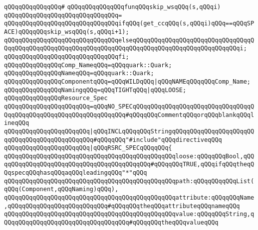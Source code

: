 \verb|qQQqqQQqqQQqqQQq#|\newline
\verb|qQQqqQQqqQQqqQQqfunqQQqskip_wsqQQq(s,qQQqi)|\newline
\verb|qQQqqQQqqQQqqQQqqQQqqQQqqQQqqQQq=|\newline
\verb|qQQqqQQqqQQqqQQqqQQqqQQqqQQqqQQqifqQQq(get_ccqQQq(s,qQQqi)qQQq==qQQqSPACE)qQQqqQQqskip_wsqQQq(s,qQQqi+1);|\newline
\verb|qQQqqQQqqQQqqQQqqQQqqQQqqQQqqQQqelseqQQqqQQqqQQqqQQqqQQqqQQqqQQqqQQqqQQqqQQqqQQqqQQqqQQqqQQqqQQqqQQqqQQqqQQqqQQqqQQqqQQqqQQqqQQqqQQqqQQqi;|\newline
\verb|qQQqqQQqqQQqqQQqqQQqqQQqqQQqqQQqfi;|\newline
\newline
\verb|qQQqqQQqqQQqqQQqComp_NameqQQq=qQQqquark::Quark;|\newline
\verb|qQQqqQQqqQQqqQQqNameqQQq=qQQqquark::Quark;|\newline
\newline
\verb|qQQqqQQqqQQqqQQqComponentqQQq=qQQqWILDqQQq|\verb#|qQQqNAMEqQQqqQQqComp_Name;#\newline
\newline
\verb|qQQqqQQqqQQqqQQqNamingqQQq=qQQqTIGHTqQQq|\verb#|qQQqLOOSE;#\newline
\newline
\verb|qQQqqQQqqQQqqQQqResource_Spec|\newline
\verb|qQQqqQQqqQQqqQQqqQQqqQQq=qQQqNO_SPECqQQqqQQqqQQqqQQqqQQqqQQqqQQqqQQqqQQqqQQqqQQqqQQqqQQqqQQqqQQqqQQqqQQq#qQQqqQQqCommentqQQqorqQQqblankqQQqlineqQQq|\newline
\verb|qQQqqQQqqQQqqQQqqQQqqQQq|\verb#|qQQqINCLqQQqqQQqStringqQQqqQQqqQQqqQQqqQQqqQQqqQQqqQQqqQQqqQQqqQQqqQQq#\verb|#qQQqqQQq"#include"qQQqdirectiveqQQq|\newline
\verb|qQQqqQQqqQQqqQQqqQQqqQQq|\verb#|qQQqRSRC_SPECqQQqqQQq{#\newline
\verb|qQQqqQQqqQQqqQQqqQQqqQQqqQQqqQQqqQQqqQQqqQQqqQQqloose:qQQqqQQqBool,qQQqqQQqqQQqqQQqqQQqqQQqqQQqqQQqqQQqqQQqqQQq#qQQqqQQqTRUE,qQQqifqQQqtheqQQqspecqQQqhasqQQqaqQQqleadingqQQq"*"qQQq|\newline
\verb|qQQqqQQqqQQqqQQqqQQqqQQqqQQqqQQqqQQqqQQqqQQqqQQqpath:qQQqqQQqqQQqList(qQQq(Component,qQQqNaming)qQQq),|\newline
\verb|qQQqqQQqqQQqqQQqqQQqqQQqqQQqqQQqqQQqqQQqqQQqqQQqattribute:qQQqqQQqName,qQQqqQQqqQQqqQQqqQQqqQQqqQQq#qQQqqQQqtheqQQqattributeqQQqnameqQQq|\newline
\verb|qQQqqQQqqQQqqQQqqQQqqQQqqQQqqQQqqQQqqQQqqQQqqQQqvalue:qQQqqQQqString,qQQqqQQqqQQqqQQqqQQqqQQqqQQqqQQqqQQq#qQQqqQQqtheqQQqvalueqQQq|\newline
